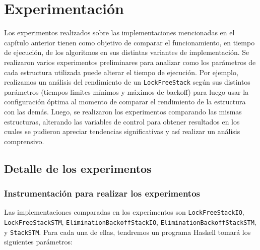 \chapter{Experimentación}
Los experimentos realizados sobre las implementaciones mencionadas en el capítulo anterior tienen como objetivo de comparar el funcionamiento, en tiempo de ejecución, de los algoritmos en sus distintas variantes de implementación. Se realizaron varios experimentos preliminares para analizar como los parámetros de cada estructura utilizada puede alterar el tiempo de ejecución. Por ejemplo, realizamos un análisis del rendimiento de un \texttt{LockFreeStack} según sus distintos parámetros (tiempos limites mínimos y máximos de backoff) para luego usar la configuración óptima al momento de comparar el rendimiento de la estructura con las demás. Luego, se realizaron los experimentos comparando las mismas estructuras, alterando las variables de control para obtener resultados en los cuales se pudieron apreciar tendencias significativas y así realizar un análisis comprensivo.

\section{Detalle de los experimentos}

\subsection{Instrumentación para realizar los experimentos}
Las implementaciones comparadas en los experimentos son \texttt{LockFreeStackIO}, \texttt{LockFreeStackSTM}, \texttt{EliminationBackoffStackIO}, \texttt{EliminationBackoffStackSTM}, y \texttt{StackSTM}. Para cada una de ellas, tendremos un programa Haskell tomará los siguientes parámetros:

